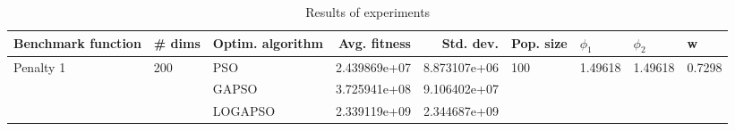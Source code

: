\begin{table}
\centering
\caption{Results of experiments}
\begin{tabular}{lllrrllll}
\toprule
        Benchmark function &              \# dims & Optim. algorithm &  Avg. fitness &    Std. dev. &            Pop. size &               $\phi_{1}$ &               $\phi_{2}$ &                       w \\
\midrule
\multirow{3}{*}{Penalty 1} & \multirow{3}{*}{200} &              PSO &  2.439869e+07 & 8.873107e+06 & \multirow{3}{*}{100} & \multirow{3}{*}{1.49618} & \multirow{3}{*}{1.49618} & \multirow{3}{*}{0.7298} \\
                           &                      &            GAPSO &  3.725941e+08 & 9.106402e+07 &                      &                          &                          &                         \\
                           &                      &          LOGAPSO &  2.339119e+09 & 2.344687e+09 &                      &                          &                          &                         \\
\bottomrule
\end{tabular}
\end{table}
